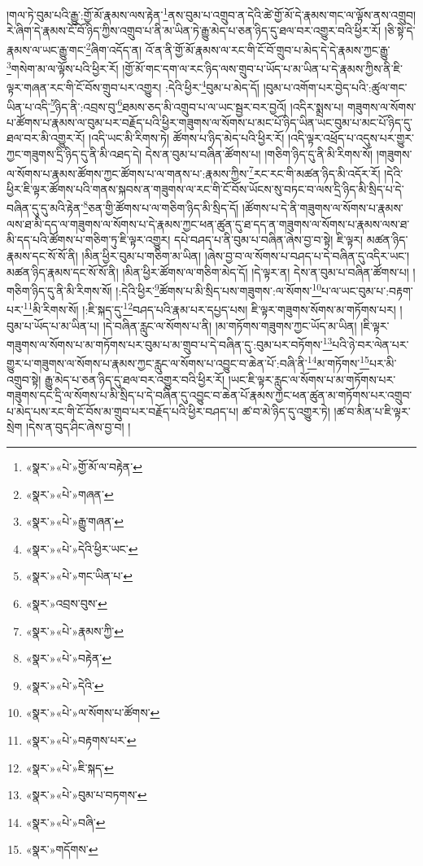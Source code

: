 །གལ་ཏེ་བུམ་པའི་རྒྱུ་:གྱོ་མོ་རྣམས་ལས་རྟེན་\footnote{«སྣར་»«པེ་»གྱོ་མོ་ལ་བརྟེན་}ནས་བུམ་པ་འགྲུབ་ན་དེའི་ཚེ་གྱོ་མོ་དེ་རྣམས་གང་ལ་ལྟོས་ནས་འགྲུབ། རེ་ཞིག་དེ་རྣམས་ངོ་བོ་ཉིད་ཀྱིས་འགྲུབ་པ་ནི་མ་ཡིན་ཏེ་རྒྱུ་མེད་པ་ཅན་ཉིད་དུ་ཐལ་བར་འགྱུར་བའི་ཕྱིར་རོ། །ཅི་སྟེ་དེ་རྣམས་ལ་ཡང་རྒྱུ་གང་\footnote{«སྣར་»«པེ་»གཞན་}ཞིག་འདོད་ན། འོ་ན་ནི་གྱོ་མོ་རྣམས་ལ་རང་གི་ངོ་བོ་གྲུབ་པ་མེད་དེ་དེ་རྣམས་ཀྱང་རྒྱུ་\footnote{«སྣར་»«པེ་»རྒྱུ་གཞན་}གསེག་མ་ལ་ལྟོས་པའི་ཕྱིར་རོ། །གྱོ་མོ་གང་དག་ལ་རང་ཉིད་ལས་གྲུབ་པ་ཡོད་པ་མ་ཡིན་པ་དེ་རྣམས་ཀྱིས་ནི་ཇི་ལྟར་གཞན་རང་གི་ངོ་བོས་གྲུབ་པར་འགྱུར། :དེའི་ཕྱིར་\footnote{«སྣར་»«པེ་»དེའི་ཕྱིར་ཡང་}བུམ་པ་མེད་དོ། །བུམ་པ་འགོག་པར་བྱེད་པའི་:ཚུལ་གང་ཡིན་པ་འདི་\footnote{«སྣར་»«པེ་»གང་ཡིན་པ་}ཉིད་ནི་:འབྲས་བུ་\footnote{«སྣར་»འབྲས་བུས་}ཐམས་ཅད་མི་འགྲུབ་པ་ལ་ཡང་སྦྱར་བར་བྱའོ། །འདིར་སྨྲས་པ། གཟུགས་ལ་སོགས་པ་ཚོགས་པ་རྣམས་ལ་བུམ་པར་བརྗོད་པའི་ཕྱིར་གཟུགས་ལ་སོགས་པ་མང་པོ་ཉིད་ཡིན་ཡང་བུམ་པ་མང་པོ་ཉིད་དུ་ཐལ་བར་མི་འགྱུར་རོ། །འདི་ཡང་མི་རིགས་ཏེ། ཚོགས་པ་ཉིད་མེད་པའི་ཕྱིར་རོ། །འདི་ལྟར་འཕྲོད་པ་འདུས་པར་གྱུར་ཀྱང་གཟུགས་དྲི་ཉིད་དུ་ནི་མི་འཐད་དེ། དེས་ན་བུམ་པ་བཞིན་ཚོགས་པ། །གཅིག་ཉིད་དུ་ནི་མི་རིགས་སོ། །གཟུགས་ལ་སོགས་པ་རྣམས་ཚོགས་ཀྱང་ཚོགས་པ་ལ་གནས་པ་:རྣམས་ཀྱིས་\footnote{«སྣར་»«པེ་»རྣམས་ཀྱི་}རང་རང་གི་མཚན་ཉིད་མི་འདོར་རོ། །དེའི་ཕྱིར་ཇི་ལྟར་ཚོགས་པའི་གནས་སྐབས་ན་གཟུགས་ལ་རང་གི་ངོ་བོས་ཡོངས་སུ་བཏང་བ་ལས་དྲི་ཉིད་མི་སྲིད་པ་དེ་བཞིན་དུ་དུ་མའི་རྟེན་\footnote{«སྣར་»«པེ་»བརྟེན་}ཅན་གྱི་ཚོགས་པ་ལ་གཅིག་ཉིད་མི་སྲིད་དོ། །ཚོགས་པ་དེ་ནི་གཟུགས་ལ་སོགས་པ་རྣམས་ལས་ཐ་མི་དད་ལ་གཟུགས་ལ་སོགས་པ་དེ་རྣམས་ཀྱང་ཕན་ཚུན་དུ་ཐ་དད་ན་གཟུགས་ལ་སོགས་པ་རྣམས་ལས་ཐ་མི་དད་པའི་ཚོགས་པ་གཅིག་ཏུ་ཇི་ལྟར་འགྱུར། དཔེ་བཤད་པ་ནི་བུམ་པ་བཞིན་ཞེས་བྱ་བ་སྟེ། ཇི་ལྟར། མཚན་ཉིད་རྣམས་དང་སོ་སོ་ནི། །མིན་ཕྱིར་བུམ་པ་གཅིག་མ་ཡིན། །ཞེས་བྱ་བ་ལ་སོགས་པ་བཤད་པ་དེ་བཞིན་དུ་འདིར་ཡང་། མཚན་ཉིད་རྣམས་དང་སོ་སོ་ནི། །མིན་ཕྱིར་ཚོགས་ལ་གཅིག་མེད་དོ། །དེ་ལྟར་ན། དེས་ན་བུམ་པ་བཞིན་ཚོགས་པ། །གཅིག་ཉིད་དུ་ནི་མི་རིགས་སོ། །:དེའི་ཕྱིར་\footnote{«སྣར་»«པེ་»དེའི་}ཚོགས་པ་མི་སྲིད་པས་གཟུགས་:ལ་སོགས་\footnote{«སྣར་»«པེ་»ལ་སོགས་པ་ཚོགས་}པ་ལ་ཡང་བུམ་པ་:བརྟག་པར་\footnote{«སྣར་»«པེ་»བརྟགས་པར་}མི་རིགས་སོ། །:ཇི་སྐད་དུ་\footnote{«སྣར་»«པེ་»ཇི་སྐད་}བཤད་པའི་རྣམ་པར་དཔྱད་པས། ཇི་ལྟར་གཟུགས་སོགས་མ་གཏོགས་པར། །བུམ་པ་ཡོད་པ་མ་ཡིན་པ། །དེ་བཞིན་རླུང་ལ་སོགས་པ་ནི། །མ་གཏོགས་གཟུགས་ཀྱང་ཡོད་མ་ཡིན། །ཇི་ལྟར་གཟུགས་ལ་སོགས་པ་མ་གཏོགས་པར་བུམ་པ་མ་གྲུབ་པ་དེ་བཞིན་དུ་:བུམ་པར་བཏོགས་\footnote{«སྣར་»«པེ་»བུམ་པ་བཏགས་}པའི་ཉེ་བར་ལེན་པར་གྱུར་པ་གཟུགས་ལ་སོགས་པ་རྣམས་ཀྱང་རླུང་ལ་སོགས་པ་འབྱུང་བ་ཆེན་པོ་:བཞི་ནི་\footnote{«སྣར་»«པེ་»བཞི་}མ་གཏོགས་\footnote{«སྣར་»གདོགས་}པར་མི་འགྲུབ་སྟེ། རྒྱུ་མེད་པ་ཅན་ཉིད་དུ་ཐལ་བར་འགྱུར་བའི་ཕྱིར་རོ། །ཡང་ཇི་ལྟར་རླུང་ལ་སོགས་པ་མ་གཏོགས་པར་གཟུགས་དང་དྲི་ལ་སོགས་པ་མི་སྲིད་པ་དེ་བཞིན་དུ་འབྱུང་བ་ཆེན་པོ་རྣམས་ཀྱང་ཕན་ཚུན་མ་གཏོགས་པར་འགྲུབ་པ་མེད་པས་རང་གི་ངོ་བོས་མ་གྲུབ་པར་བརྗོད་པའི་ཕྱིར་བཤད་པ། ཚ་བ་མེ་ཉིད་དུ་འགྱུར་ཏེ། །ཚ་བ་མིན་པ་ཇི་ལྟར་སྲེག །དེས་ན་བུད་ཤིང་ཞེས་བྱ་བ། །
